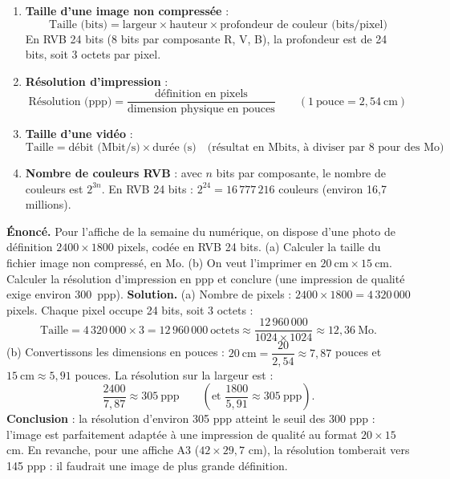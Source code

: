 \documentclass[11pt]{article}
\begin{document}
\begin{propriete}
\begin{enumerate}
\item \textbf{Taille d'une image non compressée} :
\[ \text{Taille (bits)} = \text{largeur} \times \text{hauteur} \times \text{profondeur de couleur (bits/pixel)} \]
En RVB 24 bits (8 bits par composante R, V, B), la profondeur est de 24 bits, soit 3 octets par pixel.
\item \textbf{Résolution d'impression} :
\[ \text{Résolution (ppp)} = \frac{\text{définition en pixels}}{\text{dimension physique en pouces}} \qquad (1\ \text{pouce} = 2{,}54\ \text{cm}) \]
\item \textbf{Taille d'une vidéo} :
\[ \text{Taille} = \text{débit (Mbit/s)} \times \text{durée (s)} \quad \text{(résultat en Mbits, à diviser par 8 pour des Mo)} \]
\item \textbf{Nombre de couleurs RVB} : avec $n$ bits par composante, le nombre de couleurs est $2^{3n}$. En RVB 24 bits : $2^{24} = 16\,777\,216$ couleurs (environ 16,7 millions).
\end{enumerate}
\end{propriete}

\begin{exoresolu}
\textbf{Énoncé.} Pour l'affiche de la semaine du numérique, on dispose d'une photo de définition $2400 \times 1800$ pixels, codée en RVB 24 bits. (a) Calculer la taille du fichier image non compressé, en Mo. (b) On veut l'imprimer en $20\ \text{cm} \times 15\ \text{cm}$. Calculer la résolution d'impression en ppp et conclure (une impression de qualité exige environ \SI{300}{ppp}).
\tcblower
\textbf{Solution.}
(a) Nombre de pixels : $2400 \times 1800 = 4\,320\,000$ pixels. Chaque pixel occupe 24 bits, soit 3 octets :
\[ \text{Taille} = 4\,320\,000 \times 3 = 12\,960\,000\ \text{octets} \approx \frac{12\,960\,000}{1024 \times 1024} \approx 12{,}36\ \text{Mo}. \]
(b) Convertissons les dimensions en pouces : $20\ \text{cm} = \dfrac{20}{2{,}54} \approx 7{,}87$ pouces et $15\ \text{cm} \approx 5{,}91$ pouces. La résolution sur la largeur est :
\[ \frac{2400}{7{,}87} \approx 305\ \text{ppp} \qquad \left(\text{et } \frac{1800}{5{,}91} \approx 305\ \text{ppp}\right). \]
\textbf{Conclusion} : la résolution d'environ 305 ppp atteint le seuil des 300 ppp : l'image est parfaitement adaptée à une impression de qualité au format $20 \times 15$ cm. En revanche, pour une affiche A3 ($42 \times 29{,}7$ cm), la résolution tomberait vers 145 ppp : il faudrait une image de plus grande définition.
\end{exoresolu}
\end{document}
